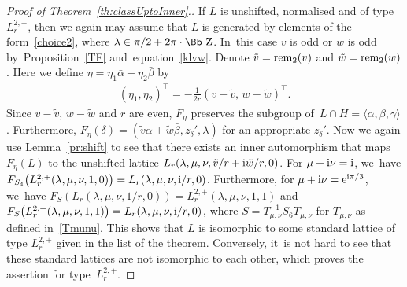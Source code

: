 \documentclass[pdftex]{sigma}
\newcommand\ZZ{{\mbox{\Bb Z}}}
\newcommand{\rem}{\mathop{{\rm rem}}}
\newcommand\la{\langle}
\newcommand\ra{\rangle}
\numberwithin{equation}{section}
\begin{document}
\begin{proof}[Proof of Theorem~\ref{th:classUptoInner}.]
If $L$ is unshifted, normalised and of type $L^{2,+}_r$, then we again may assume that $L$ is generated by elements of the form~\eqref{choice2}, where $\lambda\in\pi/2+2\pi\cdot\ZZ$. In~this case $v$ is odd or $w$ is odd by~Proposition~\ref{TF} and~equation~\eqref{klvw}. Denote $\tilde v=\rem_2(v)$ and $\tilde w=\rem_2(w)$.
Here we define $\eta=\eta_1\bar \alpha +\eta_2\bar\beta$ by
\begin{gather*}
(\eta_1,\eta_2)^\top=-\frac{1}{2r}(v-\tilde v,\,w-\tilde w)^\top.
\end{gather*}
Since $v-\tilde v$, $w-\tilde w$ and $r$ are even, $F_{\eta}$ preserves the subgroup of~$L\cap H=\la \alpha,\beta,\gamma\ra$. Furthermore, $F_{\eta}(\delta)=(\tilde v\bar\alpha+\tilde w\bar\beta,z_\delta',\lambda)$ for an appropriate $z_\delta'$.
Now we again use Lemma~\ref{pr:shift} to see that there exists an inner automorphism that maps $F_\eta(L)$ to the unshifted lattice $L_r(\lambda,\mu,\nu,\tilde v/r+{\rm i}\tilde w/r,0)$.
For $\mu+{\rm i}\nu={\rm i}$, we~have $F_{S_4}\big(L^{2,+}_r(\lambda,\mu,\nu,1,0)\big)=L_r(\lambda,\mu,\nu,{\rm i}/r,0)$. Furthermore, for $\mu+{\rm i}\nu={\rm e}^{{\rm i}\pi/3}$, we~have $F_{S}(L_r(\lambda,\mu,\nu,1/r,0))=L^{2,+}_r(\lambda,\mu,\nu,1,1)$ and $F_{S}\big(L^{2,+}_r(\lambda,\mu,\nu,1,1)\big)=L_r(\lambda,\mu,\nu,{\rm i}/r,0)$, where $S=T_{\mu,\nu}^{-1}S_6T_{\mu,\nu}$ for $T_{\mu,\nu}$ as defined in~\eqref{Tmunu}.
This shows that $L$ is isomorphic to some standard lattice of type $L^{2,+}_r$ given in the list of the theorem. Conversely, it~is not hard to see that these standard lattices are not isomorphic to each other, which proves the assertion for type~$L^{2,+}_r$.


\end{proof}
\end{document}
